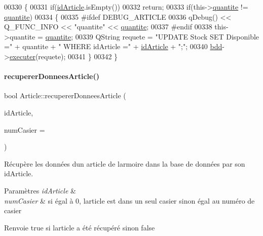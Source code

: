 \begin{DoxyCode}
00330 \{
00331     \textcolor{keywordflow}{if}(\hyperlink{class_article_a9f2f7a04139f26accec145066a5aacae}{idArticle}.isEmpty())
00332         \textcolor{keywordflow}{return};
00333     \textcolor{keywordflow}{if}(this->\hyperlink{class_article_a0870104453080b43bc271346217a864b}{quantite} != \hyperlink{class_article_a0870104453080b43bc271346217a864b}{quantite})
00334     \{
00335 \textcolor{preprocessor}{        #ifdef DEBUG\_ARTICLE}
00336             qDebug() << Q\_FUNC\_INFO << \textcolor{stringliteral}{"quantite"} << \hyperlink{class_article_a0870104453080b43bc271346217a864b}{quantite};
00337 \textcolor{preprocessor}{        #endif}
00338         this->quantite = \hyperlink{class_article_a0870104453080b43bc271346217a864b}{quantite};
00339         QString requete = \textcolor{stringliteral}{"UPDATE Stock SET Disponible ="} + quantite + \textcolor{stringliteral}{" WHERE idArticle ="} + 
      \hyperlink{class_article_a9f2f7a04139f26accec145066a5aacae}{idArticle} + \textcolor{stringliteral}{";"};
00340         \hyperlink{class_article_a7221cec4212d86d74f479b9ee683ee8a}{bdd}->\hyperlink{class_bdd_ab6ae645b4b54ce5df8dc9b422fb39faa}{executer}(requete);
00341     \}
00342 \}
\end{DoxyCode}
\mbox{\label{class_article_ae657464da12790b763659ca98a948f50}} 
\paragraph{\texorpdfstring{recuperer\+Donnees\+Article()}{recupererDonneesArticle()}}
{\footnotesize\ttfamily bool Article\+::recuperer\+Donnees\+Article (\begin{DoxyParamCaption}\item[{Q\+String}]{id\+Article,  }\item[{int}]{num\+Casier = {} }\end{DoxyParamCaption})}



Récupère les données d\textquotesingle{}un article de l\textquotesingle{}armoire dans la base de données par son id\+Article. 


\begin{DoxyParams}{Paramètres}
{\em id\+Article} & \\
\hline
{\em num\+Casier} & si égal à 0, l\textquotesingle{}article est dans un seul casier sinon égal au numéro de casier \\
\hline
\end{DoxyParams}
\begin{DoxyReturn}{Renvoie}
true si l\textquotesingle{}article a été récupéré sinon false 
\end{DoxyReturn}


